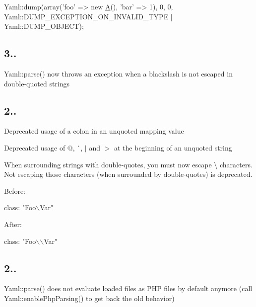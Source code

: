 \begin{DoxyCode}
Yaml::dump(array(\textcolor{stringliteral}{'foo'} => \textcolor{keyword}{new} \mbox{\hyperlink{class_a}{A}}(), \textcolor{stringliteral}{'bar'} => 1), 0, 0, Yaml::DUMP\_EXCEPTION\_ON\_INVALID\_TYPE | 
      Yaml::DUMP\_OBJECT);
\end{DoxyCode}


\subsection*{3.. }


\begin{DoxyItemize}
\item Yaml\+::parse() now throws an exception when a blackslash is not escaped in double-\/quoted strings
\end{DoxyItemize}

\subsection*{2.. }


\begin{DoxyItemize}
\item Deprecated usage of a colon in an unquoted mapping value
\item Deprecated usage of @, \`{}, $\vert$ and $>$ at the beginning of an unquoted string
\item When surrounding strings with double-\/quotes, you must now escape {\ttfamily \textbackslash{}} characters. Not escaping those characters (when surrounded by double-\/quotes) is deprecated.

Before\+:
\end{DoxyItemize}


\begin{DoxyCode}
class: "Foo\(\backslash\)Var"
\end{DoxyCode}


After\+:


\begin{DoxyCode}
class: "Foo\(\backslash\)\(\backslash\)Var"
\end{DoxyCode}


\subsection*{2.. }


\begin{DoxyItemize}
\item Yaml\+::parse() does not evaluate loaded files as P\+HP files by default anymore (call Yaml\+::enable\+Php\+Parsing() to get back the old behavior) 
\end{DoxyItemize}